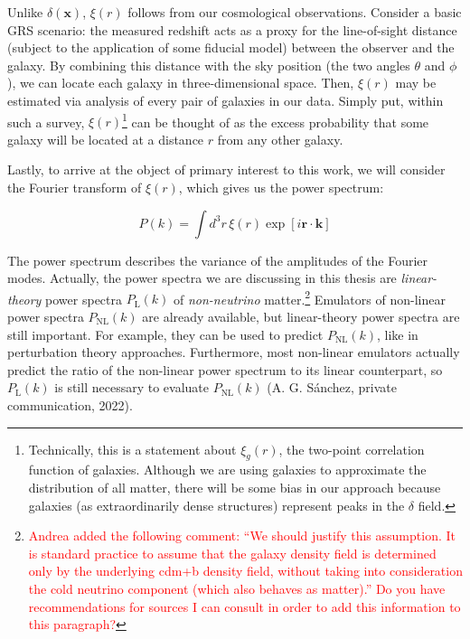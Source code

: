 Unlike $\delta(\bm{x})$, $\xi(r)$ follows from our cosmological
observations. Consider a basic GRS scenario: the
measured redshift acts as a proxy for the line-of-sight distance (subject to
the application of some fiducial model) between the observer and the galaxy. 
By combining this distance with the sky position (the two angles $\theta$ and
$\phi$), we can locate each galaxy in three-dimensional space. Then, $\xi(r)$ 
may be estimated via analysis of every pair of galaxies in our data. Simply
put, within such a survey, $\xi(r)$\footnote{Technically, this is a statement
about $\xi_g(r)$, the two-point correlation function of galaxies. Although we
are using galaxies to approximate the distribution of all matter, there will
be some bias in our approach because galaxies (as extraordinarily dense 
structures) represent peaks in the $\delta$ field.} can be thought
of as the excess probability that some galaxy will be located at a distance
$r$ from any other galaxy.

Lastly, to arrive at the object of primary interest to this work, we will
consider the Fourier transform of $\xi(r)$, which gives us the power spectrum:

\begin{equation}
P(k) = \int d^3 r \, \xi(r) \exp [i \bm{r} \cdot \bm{k}]
\end{equation}


The power spectrum describes the variance of the amplitudes of the Fourier
modes. Actually, the power spectra we are discussing in this thesis are 
\textit{linear-theory} power spectra $P_\text{L}(k)$ of \textit{non-neutrino} 
matter.\footnote{\textcolor{red}{Andrea added the following comment: ``We 
should 
justify this assumption. It is standard practice to assume that the galaxy 
density field is determined only by the underlying cdm+b density field, 
without taking into consideration the cold neutrino component (which also 
behaves as matter).'' Do you have recommendations for sources I can consult in
order to add this information to this paragraph?}} Emulators of non-linear 
power spectra $P_\text{NL}(k)$ are 
already available, but linear-theory power spectra are still important.
For example, they can be used to predict $P_\text{NL}(k)$, like in 
perturbation theory approaches. Furthermore, most non-linear emulators
actually predict the ratio of the non-linear power spectrum to its linear
counterpart, so $P_\text{L}(k)$ is still necessary to evaluate
$P_\text{NL}(k)$ (A. G. S\'{a}nchez, private communication, 2022).

